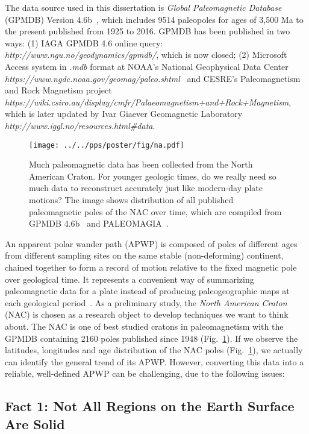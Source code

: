The data source used in this dissertation is \emph{Global Paleomagnetic
Database} (GPMDB) Version 4.6b~\cite[updated in 2016 by the Ivar Giaever
Geomagnetic Laboratory team, in collaboration with Pisarevsky]{M96,P05}, which
includes 9514 paleopoles for ages of 3,500 Ma to the present published from 1925
to 2016. GPMDB has been published in two ways: (1) IAGA GPMDB 4.6 online query:
\emph{http://www.ngu.no/geodynamics/gpmdb/}, which is now closed; (2) Microsoft
Access system in \emph{.mdb} format at NOAA's National Geophysical Data Center
\emph{https://www.ngdc.noaa.gov/geomag/paleo.shtml}~\citep{P03}
and CESRE's Paleomagnetism and Rock Magnetism project
\emph{https://wiki.csiro.au/display/cmfr/Palaeomagnetism+and+Rock+Magnetism},
which is later updated by Ivar Giaever Geomagnetic Laboratory
\emph{http://www.iggl.no/resources.html\#data}.

\begin{figure}
\centering
\texttt{[image: ../../pps/poster/fig/na.pdf]}
\captionsetup{width=.95\textwidth}
\caption{Much paleomagnetic data has been collected from the North American
Craton. For younger geologic times, do we really need so much data to
reconstruct accurately just like modern-day plate motions? The image shows
distribution of all published paleomagnetic poles of the NAC over time, which
are compiled from GPMDB 4.6b~\citep{P05} and
PALEOMAGIA~\citep{V14}.}\label{Fig:chap_intro_nacpole}
\end{figure}

An apparent polar wander path (APWP) is composed of poles of different ages
from different sampling sites on the same stable (non-deforming) continent,
chained together to form a record of motion relative to the fixed magnetic pole
over geological time. It represents a convenient way of summarizing
paleomagnetic data for a plate instead of producing paleogeographic maps at
each geological period~\citep{T08}. As a preliminary study, the \emph{North
American Craton} (NAC) is chosen as a research object to develop techniques we
want to think about. The NAC is one of best studied cratons in paleomagnetism
with the GPMDB containing 2160 poles published since 1948
(Fig.~\ref{Fig:chap_intro_nacpole}). If we observe the latitudes, longitudes and
age distribution of the NAC poles (Fig.~\ref{Fig:chap_intro_nacpole}), we
actually can identify the general trend of its APWP\@. However, converting this
data into a reliable, well-defined APWP can be challenging, due to the following
issues:

\subsection{Fact 1: Not All Regions on the Earth Surface Are
Solid}\label{sec:f1}

